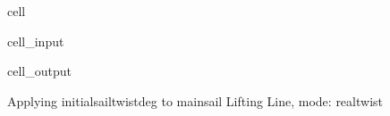 \documentclass[letterpaper,10pt,english]{jupyterBook}
\begin{document}
\begin{sphinxuseclass}{cell}
\begin{sphinxVerbatimInput}
\begin{sphinxuseclass}{cell_input}
\end{sphinxuseclass}\end{sphinxVerbatimInput}
\begin{sphinxVerbatimOutput}

\begin{sphinxuseclass}{cell_output}
\begin{sphinxVerbatim}[commandchars=\\\{\}]
Applying initial\PYGZus{}sail\PYGZus{}twist\PYGZus{}deg to main\PYGZus{}sail \PYGZhy{}  Lifting Line, mode: real\PYGZus{}twist
\end{sphinxVerbatim}

\end{sphinxuseclass}\end{sphinxVerbatimOutput}

\end{sphinxuseclass}
\end{document}
